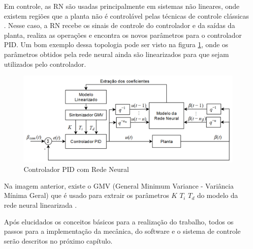 Em controle, as RN são usadas principalmente em sistemas não lineares, onde existem regiões que a planta não é controlável pelas técnicas de controle clássicas . Nesse caso, a RN recebe os sinais de controle do controlador e da saídas da planta, realiza as operações e encontra os novos parâmetros para o controlador PID. Um bom exemplo dessa topologia pode ser visto na figura \ref{fig:pid_neural_chen_p212}, onde os parâmetros obtidos pela rede neural ainda são linearizados para que sejam utilizados pelo controlador.

\begin{figure}[H]
  \caption{Controlador PID com Rede Neural}
  \begin{center}
      \includegraphics[scale=0.55]{img/pid_neural_chen_p212}
  \end{center}
  \label{fig:pid_neural_chen_p212}
\end{figure}

Na imagem anterior, existe o GMV (General Minimum Variance - Variância Mínima Geral) que é usado para extrair os parâmetros $K$ $T_i$ $T_d$ do modelo da rede neural linearizada .

Após elucidados os conceitos básicos para a realização do trabalho, todos os passos para a implementação da mecânica, do software e o sistema de controle serão descritos no próximo capítulo.


